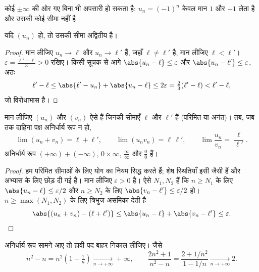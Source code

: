 \begin{remark}
कोई  $\pm\infty$ की ओर गए बिना भी अपसारी हो सकता है:  $u_n = (-1)^n$ केवल मान
$1$ और $-1$ लेता है और उसकी कोई सीमा नहीं है।
\end{remark}

\begin{proposition}[सीमा की अद्वितीयता]\label{prop:g12:seq:uniqueness}
यदि $(u_n)$  हो, तो उसकी सीमा अद्वितीय है।
\end{proposition}

\begin{proof}
मान लीजिए $u_n \to \ell$ और $u_n \to \ell'$ हैं, जहाँ $\ell \neq \ell'$ है, मान लीजिए $\ell < \ell'$। $\varepsilon = \frac{\ell' - \ell}{3} > 0$ रखिए।
किसी सूचक से आगे $\abs{u_n - \ell} \leq \varepsilon$ और $\abs{u_n - \ell'} \leq \varepsilon$, अतः
\[
\ell' - \ell \leq \abs{\ell' - u_n} + \abs{u_n - \ell}
\leq 2\varepsilon = \tfrac{2}{3}(\ell' - \ell) < \ell' - \ell,
\]
जो विरोधाभास है।
\end{proof}

\begin{proposition}[सीमाओं पर संक्रियाएँ]\label{prop:g12:seq:operations}
मान लीजिए $(u_n)$ और $(v_n)$ ऐसे  हैं जिनकी सीमाएँ $\ell$ और $\ell'$ हैं
(परिमित या अनंत)। तब, जब तक दाहिना पक्ष अनिर्धार्य रूप न हो,
\[
\lim (u_n + v_n) = \ell + \ell', \qquad
\lim (u_n v_n) = \ell\,\ell', \qquad
\lim \frac{u_n}{v_n} = \frac{\ell}{\ell'}.
\]
अनिर्धार्य रूप $(+\infty) + (-\infty)$, $0 \times \infty$, $\frac{\infty}{\infty}$ और $\frac{0}{0}$ हैं।
\end{proposition}

\begin{proof}
हम परिमित सीमाओं के लिए योग का नियम सिद्ध करते हैं; शेष स्थितियाँ इसी जैसी
हैं और अभ्यास के लिए छोड़ दी गई हैं। मान लीजिए $\varepsilon > 0$ है। ऐसे $N_1, N_2$ हैं कि
$n \geq N_1$ के लिए $\abs{u_n - \ell} \leq \varepsilon/2$ और $n \geq N_2$ के लिए $\abs{v_n - \ell'} \leq \varepsilon/2$ हो। $n \geq \max(N_1, N_2)$ के लिए त्रिभुज असमिका
देती है
\[
\abs{(u_n + v_n) - (\ell + \ell')}
\leq \abs{u_n - \ell} + \abs{v_n - \ell'} \leq \varepsilon. \qedhere
\]
\end{proof}

\begin{method}[अनिर्धार्य रूप हटाना]\label{met:g12:seq:indeterminate}
अनिर्धार्य रूप सामने आए तो हावी पद बाहर निकाल लीजिए। जैसे
\[
n^2 - n = n^2\left(1 - \tfrac{1}{n}\right) \xrightarrow[n\to+\infty]{} +\infty,
\qquad
\frac{2n^2+1}{n^2 - n} = \frac{2 + 1/n^2}{1 - 1/n}
\xrightarrow[n\to+\infty]{} 2 .
\]
\end{method}

